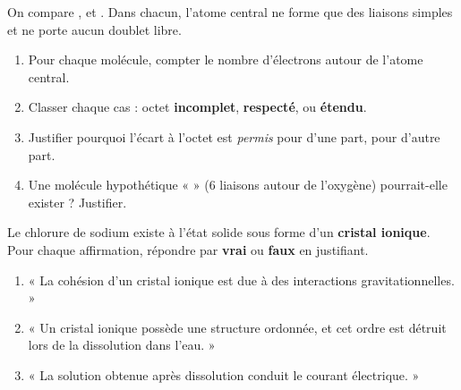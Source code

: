 \documentclass[11pt,a4paper]{article}
\begin{document}
\begin{exo}
On compare ,  et . Dans chacun, l'atome central ne forme que des liaisons
simples et ne porte aucun doublet libre.
\begin{enumerate}[label=\alph*),leftmargin=2em,itemsep=2pt]
  \item Pour chaque molécule, compter le nombre d'électrons autour de l'atome central.
  \item Classer chaque cas : octet \textbf{incomplet}, \textbf{respecté}, ou \textbf{étendu}.
  \item Justifier pourquoi l'écart à l'octet est \emph{permis} pour  d'une part, pour
         d'autre part.
  \item Une molécule hypothétique «  » (6 liaisons autour de l'oxygène) pourrait-elle
        exister ? Justifier.
\end{enumerate}
\end{exo}

\begin{exo}
Le chlorure de sodium existe à l'état solide sous forme d'un \textbf{cristal ionique}. Pour chaque
affirmation, répondre par \textbf{vrai} ou \textbf{faux} en justifiant.
\begin{enumerate}[label=\alph*),leftmargin=2em,itemsep=2pt]
  \item « La cohésion d'un cristal ionique est due à des interactions gravitationnelles. »
  \item « Un cristal ionique possède une structure ordonnée, et cet ordre est détruit lors de la
        dissolution dans l'eau. »
  \item « La solution obtenue après dissolution conduit le courant électrique. »
\end{enumerate}
\end{exo}
\end{document}
